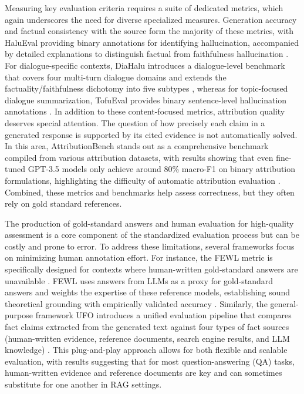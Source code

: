 \documentclass[11pt]{article}
\begin{document}
Measuring key evaluation criteria requires a suite of dedicated metrics, which again underscores the need for diverse specialized measures. Generation accuracy and factual consistency with the source form the majority of these metrics, with HaluEval providing binary annotations for identifying hallucination, accompanied by detailed explanations to distinguish factual from faithfulness hallucination \cite{ref123}. For dialogue-specific contexts, DiaHalu introduces a dialogue-level benchmark that covers four multi-turn dialogue domains and extends the factuality/faithfulness dichotomy into five subtypes \cite{ref126}, whereas for topic-focused dialogue summarization, TofuEval provides binary sentence-level hallucination annotations \cite{ref127}. In addition to these content-focused metrics, attribution quality deserves special attention. The question of how precisely each claim in a generated response is supported by its cited evidence is not automatically solved. In this area, AttributionBench stands out as a comprehensive benchmark compiled from various attribution datasets, with results showing that even fine-tuned GPT-3.5 models only achieve around 80\% macro-F1 on binary attribution formulations, highlighting the difficulty of automatic attribution evaluation \cite{ref128}. Combined, these metrics and benchmarks help assess correctness, but they often rely on gold standard references.

The production of gold-standard answers and human evaluation for high-quality assessment is a core component of the standardized evaluation process but can be costly and prone to error. To address these limitations, several frameworks focus on minimizing human annotation effort. For instance, the FEWL metric is specifically designed for contexts where human-written gold-standard answers are unavailable \cite{ref129}. FEWL uses answers from LLMs as a proxy for gold-standard answers and weights the expertise of these reference models, establishing sound theoretical grounding with empirically validated accuracy \cite{ref129}. Similarly, the general-purpose framework UFO introduces a unified evaluation pipeline that compares fact claims extracted from the generated text against four types of fact sources (human-written evidence, reference documents, search engine results, and LLM knowledge) \cite{ref130}. This plug-and-play approach allows for both flexible and scalable evaluation, with results suggesting that for most question-answering (QA) tasks, human-written evidence and reference documents are key and can sometimes substitute for one another in RAG settings.
\end{document}
